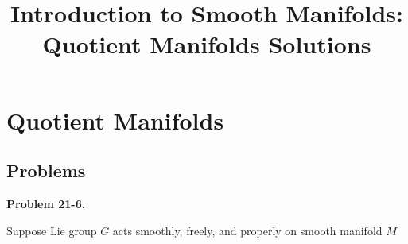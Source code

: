 \documentclass[11pt]{amsart}
\title{Introduction to Smooth Manifolds: Quotient Manifolds Solutions}
\theoremstyle{definition}
\newcommand{\problemhead}[1]{\medskip\noindent\textbf{Problem #1.} }
\begin{document}
\maketitle
\section{Quotient Manifolds}

\subsection*{ Problems }

\problemhead{21-6}

Suppose Lie group $G$ acts smoothly, freely, and properly on smooth manifold $M$
\end{document}
